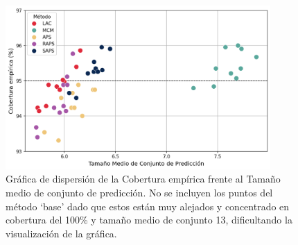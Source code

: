 \begin{figure}[h]
    \centering
    \includegraphics[width=0.9\textwidth]{capitulos/cap_05/imagenes/AGC_scatterplot_EC_MPSS.png}
    \caption[
        Problema de clasificación de edad: 
        Gráfica de dispersión de la cobertura empírica frente al tamaño medio de conjunto de predicción.
    ]{
        Gráfica de dispersión de la Cobertura empírica frente al Tamaño medio de conjunto de predicción. 
        No se incluyen los puntos del método `base' dado que estos están muy alejados y concentrado en cobertura del 100\% y tamaño medio de conjunto 13, dificultando la visualización de la gráfica. 
    }
    \label{fig:AGC_scatterplot_EC-MPSS}
\end{figure}

\FloatBarrier

